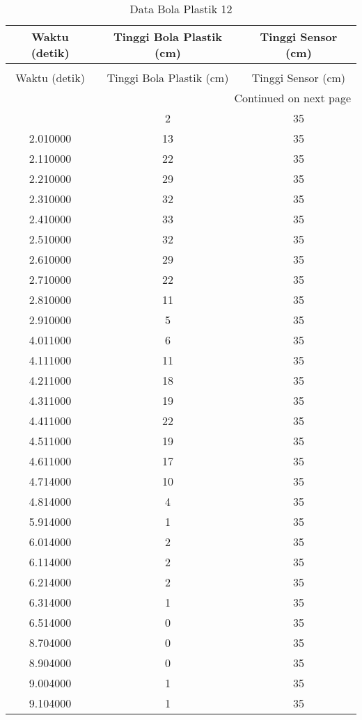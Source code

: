 \begin{longtable}[htbp]{|c|c|c|}
\caption{Data Bola Plastik 12} \\
\hline
Waktu (detik) & Tinggi Bola Plastik (cm) & Tinggi Sensor (cm) \\ \hline
\endfirsthead
\caption[]{Data Bola Plastik 12} \\
\hline
Waktu (detik) & Tinggi Bola Plastik (cm) & Tinggi Sensor (cm) \\ \hline
\endhead
\multicolumn{3}{r}{Continued on next page} \\
\endfoot
\endlastfoot
1.910000 & 2 & 35 \\ \hline
2.010000 & 13 & 35 \\ \hline
2.110000 & 22 & 35 \\ \hline
2.210000 & 29 & 35 \\ \hline
2.310000 & 32 & 35 \\ \hline
2.410000 & 33 & 35 \\ \hline
2.510000 & 32 & 35 \\ \hline
2.610000 & 29 & 35 \\ \hline
2.710000 & 22 & 35 \\ \hline
2.810000 & 11 & 35 \\ \hline
2.910000 & 5 & 35 \\ \hline
4.011000 & 6 & 35 \\ \hline
4.111000 & 11 & 35 \\ \hline
4.211000 & 18 & 35 \\ \hline
4.311000 & 19 & 35 \\ \hline
4.411000 & 22 & 35 \\ \hline
4.511000 & 19 & 35 \\ \hline
4.611000 & 17 & 35 \\ \hline
4.714000 & 10 & 35 \\ \hline
4.814000 & 4 & 35 \\ \hline
5.914000 & 1 & 35 \\ \hline
6.014000 & 2 & 35 \\ \hline
6.114000 & 2 & 35 \\ \hline
6.214000 & 2 & 35 \\ \hline
6.314000 & 1 & 35 \\ \hline
6.514000 & 0 & 35 \\ \hline
8.704000 & 0 & 35 \\ \hline
8.904000 & 0 & 35 \\ \hline
9.004000 & 1 & 35 \\ \hline
9.104000 & 1 & 35 \\ \hline

\end{longtable}
